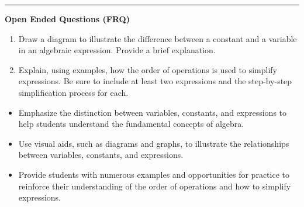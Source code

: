 \documentclass[10pt]{article}
\begin{document}
\vspace{-0.2cm}
\hrule
\vspace{0.2cm}
\textbf{\small Open Ended Questions (FRQ)}
\begin{enumerate}[label=\textbf{Q\arabic*.}, start=9, itemsep=5pt, topsep=0pt]

  \item \small Draw a diagram to illustrate the difference between a constant and a variable in an algebraic expression. Provide a brief explanation. \vspace{2cm}

  \item \small Explain, using examples, how the order of operations is used to simplify expressions. Be sure to include at least two expressions and the step-by-step simplification process for each. \vspace{4cm}

\end{enumerate}

\vfill

\begin{tcolorbox}[colback=blue!5, colframe=mainblue!50, title=\small \textbf{Chef's Tips}, fonttitle=\bfseries, bottom=1mm]
\begin{itemize}[noitemsep, topsep=2pt, leftmargin=0.5cm]
  \item \scriptsize Emphasize the distinction between variables, constants, and expressions to help students understand the fundamental concepts of algebra.\item \scriptsize Use visual aids, such as diagrams and graphs, to illustrate the relationships between variables, constants, and expressions.\item \scriptsize Provide students with numerous examples and opportunities for practice to reinforce their understanding of the order of operations and how to simplify expressions.
\end{itemize}
\end{tcolorbox}
\end{document}
